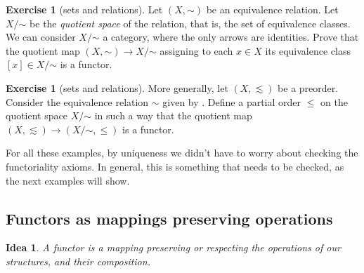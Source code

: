 \documentclass[12pt,oneside]{scrbook}
\def\simord{\mathord\sim}
\numberwithin{equation}{section}
\theoremstyle{plain}
\newtheorem*{idea}{Idea}
\theoremstyle{definition}
\newtheorem{ex}[thm]{Exercise}
\DeclareMathOperator{\1}{\mathbbm{1}}
\DeclareMathOperator{\2}{\mathbbm{2}}
\begin{document}
\begin{ex}[sets and relations]\label{quotient}
 Let $(X,\simord)$ be an equivalence relation. Let $X/\simord$ be the \emph{quotient space} of the relation, that is, the set of equivalence classes. We can consider $X/\simord$ a category, where the only arrows are identities. Prove that the quotient map $(X,\simord)\to X/\simord$ assigning to each $x\in X$ its equivalence class $[x]\in X/\simord$ is a functor.
\end{ex}

\begin{ex}[sets and relations]
 More generally, let $(X,\lesssim)$ be a preorder. Consider the equivalence relation $\sim$ given by . Define a partial order $\le$ on the quotient space $X/\simord$ in such a way that the quotient map $(X,\lesssim)\to (X/\simord, \le)$ is a functor. 
\end{ex}

For all these examples, by uniqueness we didn't have to worry about checking the functoriality axioms. In general, this is something that needs to be checked, as the next examples will show.


\subsection{Functors as mappings preserving operations}

\begin{idea}
 A functor is a mapping preserving or respecting the operations of our structures, and their composition.
\end{idea}
\end{document}
